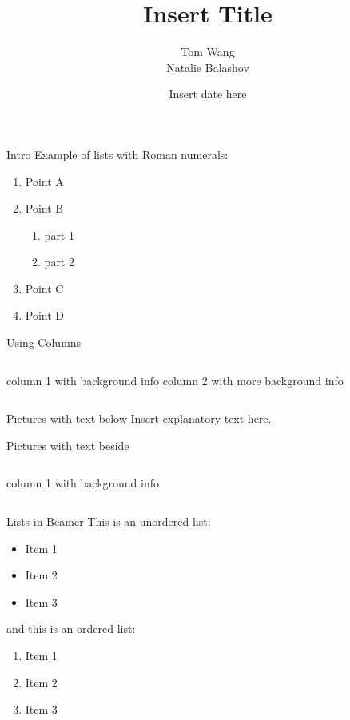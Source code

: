 \documentclass{beamer}
\title{Insert Title}
\author{Tom Wang \\ Natalie Balashov}
\date{Insert date here}
\begin{document}
\begin{frame}
    \titlepage 
\end{frame}

\begin{frame}{Intro}
    Example of lists with Roman numerals:
    \begin{enumerate}[I]
        \item Point A
        \item Point B
    \begin{enumerate}[i]
        \item part 1
        \item part 2
    \end{enumerate}
        \item Point C
        \item Point D
    \end{enumerate}
\end{frame}

\begin{frame}{Using Columns}
    \begin{columns}
            column 1 with background info
            column 2 with more background info
    \end{columns}
\end{frame}

\begin{frame}{Pictures with text below}
    Insert explanatory text here.
\end{frame}

\begin{frame}{Pictures with text beside}
    \begin{columns}
            column 1 with background info
    \end{columns}
\end{frame}

\begin{frame}{Lists in Beamer}
    This is an unordered list:
    \begin{itemize}
        \item Item 1
        \item Item 2
        \item Item 3
    \end{itemize}
    and this is an ordered list:
    \begin{enumerate}
        \item Item 1
        \item Item 2
        \item Item 3
    \end{enumerate}
\end{frame}
\end{document}
